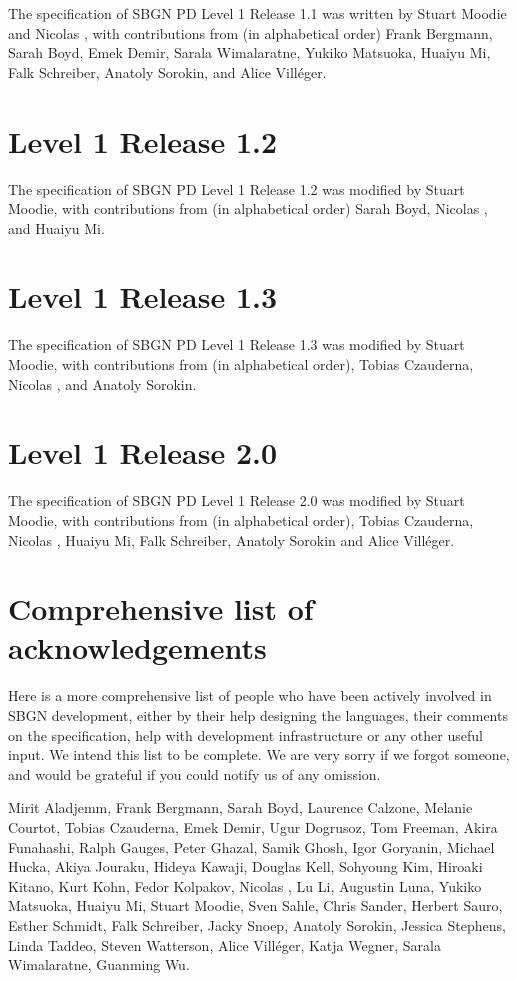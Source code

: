 The specification of SBGN PD Level 1 Release 1.1 was written by Stuart Moodie and Nicolas \lenov{}, with contributions from (in alphabetical order) Frank Bergmann, Sarah Boyd, Emek Demir, Sarala Wimalaratne, Yukiko Matsuoka, Huaiyu Mi, Falk Schreiber, Anatoly Sorokin, and Alice Vill\'{e}ger.

\section{Level 1 Release 1.2}

The specification of SBGN PD Level 1 Release 1.2 was modified by Stuart Moodie, with contributions from (in alphabetical order) Sarah Boyd, Nicolas \lenov{}, and Huaiyu Mi.

\section{Level 1 Release 1.3}

The specification of SBGN PD Level 1 Release 1.3 was modified by Stuart Moodie, with contributions from (in alphabetical order), Tobias Czauderna, Nicolas \lenov{}, and Anatoly Sorokin.

\section{Level 1 Release 2.0}

The specification of SBGN PD Level 1 Release 2.0 was modified by Stuart Moodie, with contributions from (in alphabetical order), Tobias Czauderna, Nicolas \lenov{}, Huaiyu Mi, Falk Schreiber, Anatoly Sorokin and Alice Vill\'{e}ger.

\section{Comprehensive list of acknowledgements}

Here is a more comprehensive list of people who have been actively involved in SBGN development, either by their help designing the languages, their comments on the specification, help with development infrastructure or any other useful input.  We intend this list to be complete. We are very sorry if we forgot someone, and would be grateful if you could notify us of any omission.

Mirit Aladjemm, Frank Bergmann, Sarah Boyd, Laurence Calzone, Melanie Courtot, Tobias Czauderna, Emek Demir, Ugur Dogrusoz, Tom Freeman, Akira Funahashi, Ralph Gauges, Peter Ghazal, Samik Ghosh, Igor Goryanin, Michael Hucka, Akiya Jouraku, Hideya Kawaji, Douglas Kell, Sohyoung Kim, Hiroaki Kitano, Kurt Kohn, Fedor Kolpakov, Nicolas \lenov{}, Lu Li, Augustin Luna, Yukiko Matsuoka, Huaiyu Mi, Stuart Moodie, Sven Sahle, Chris Sander, Herbert Sauro, Esther Schmidt, Falk Schreiber, Jacky Snoep, Anatoly Sorokin, Jessica Stephens, Linda Taddeo, Steven Watterson, Alice Vill\'{e}ger, Katja Wegner, Sarala Wimalaratne, Guanming Wu.

